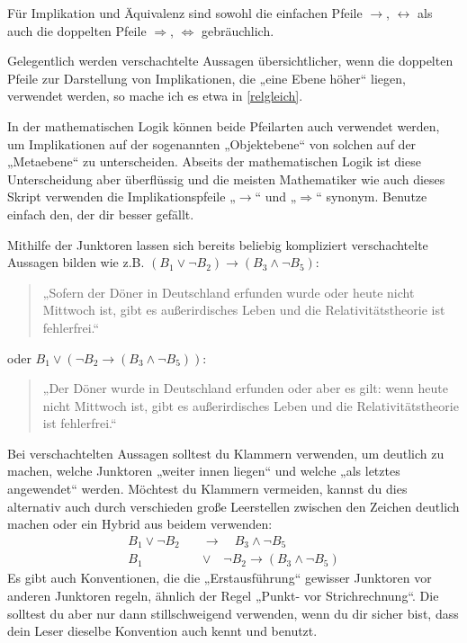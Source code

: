 	
\begin{bem}
    Für Implikation und Äquivalenz sind sowohl die einfachen Pfeile $\to$, $\leftrightarrow$ als auch die doppelten Pfeile $\Rightarrow$, $\Leftrightarrow$ gebräuchlich.
    
    Gelegentlich werden verschachtelte Aussagen übersichtlicher, wenn die doppelten Pfeile zur Darstellung von Implikationen, die „eine Ebene höher“ liegen, verwendet werden, so mache ich es etwa in \cref{relgleich}.
    
    In der mathematischen Logik können beide Pfeilarten auch verwendet werden, um Implikationen auf der sogenannten „Objektebene“ von solchen auf der „Metaebene“ zu unterscheiden. Abseits der mathematischen Logik ist diese Unterscheidung aber überflüssig und die meisten Mathematiker wie auch dieses Skript verwenden die Implikationspfeile „$\to$“ und „$\Rightarrow$“ synonym. Benutze einfach den, der dir besser gefällt.
\end{bem}

	
\begin{bem}
    Mithilfe der Junktoren lassen sich bereits beliebig kompliziert verschachtelte Aussagen bilden wie z.B. $(B_1\lor \neg B_2) \to (B_3\land \neg B_5)$:
    \begin{quote}
        „Sofern der Döner in Deutschland erfunden wurde oder heute nicht Mittwoch ist, gibt es außerirdisches Leben und die Relativitätstheorie ist fehlerfrei.“
    \end{quote}
    oder $B_1\lor (\neg B_2 \to (B_3\land \neg B_5))$:
    \begin{quote}
        „Der Döner wurde in Deutschland erfunden oder aber es gilt: wenn heute nicht Mittwoch ist, gibt es außerirdisches Leben und die Relativitätstheorie ist fehlerfrei.“
    \end{quote}
    Bei verschachtelten Aussagen solltest du Klammern verwenden, um deutlich zu machen, welche Junktoren „weiter innen liegen“ und welche „als letztes angewendet“ werden. Möchtest du Klammern vermeiden, kannst du dies alternativ auch durch verschieden große Leerstellen zwischen den Zeichen deutlich machen oder ein Hybrid aus beidem verwenden:
    \begin{align*}
        B_1\lor \neg B_2\quad &\to \quad B_3\land \neg B_5 \\[0.5em]
        B_1\quad  &\lor \quad \neg B_2 \to (B_3\land \neg B_5)
    \end{align*}
    Es gibt auch Konventionen, die die „Erstausführung“ gewisser Junktoren vor anderen Junktoren regeln, ähnlich der Regel „Punkt- vor Strichrechnung“. Die solltest du aber nur dann stillschweigend verwenden, wenn du dir sicher bist, dass dein Leser dieselbe Konvention auch kennt und benutzt.
\end{bem}


